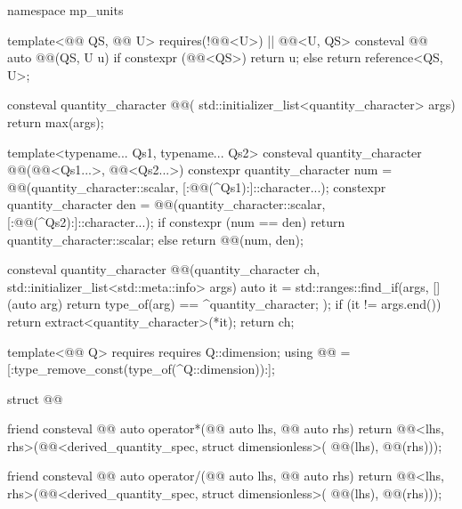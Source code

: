 \begin{codeblock}
namespace mp_units {

template<@@ QS, @@ U>
  requires(!@@<U>) || @@<U, QS{}>
consteval @@ auto @@(QS, U u)
{
  if constexpr (@@<QS>)
    return u;
  else
    return reference<QS, U>{};
}

consteval quantity_character @@(
  std::initializer_list<quantity_character> args)
{
  return max(args);
}

template<typename... Qs1, typename... Qs2>
consteval quantity_character @@(@@<Qs1...>, @@<Qs2...>)
{
  constexpr quantity_character num =
    @@({quantity_character::scalar, [:@@(^Qs1):]::character...});
  constexpr quantity_character den =
    @@({quantity_character::scalar, [:@@(^Qs2):]::character...});
  if constexpr (num == den)
    return quantity_character::scalar;
  else
    return @@({num, den});
}

consteval quantity_character @@(quantity_character ch,
                                                     std::initializer_list<std::meta::info> args)
{
  auto it =
    std::ranges::find_if(args, [](auto arg) { return type_of(arg) == ^quantity_character; });
  if (it != args.end()) return extract<quantity_character>(*it);
  return ch;
}

template<@@ Q>
  requires requires { Q::dimension; }
using @@ = [:type_remove_const(type_of(^Q::dimension)):];

struct @@ {
  friend consteval @@ auto operator*(@@ auto lhs, @@ auto rhs)
  {
    return @@<lhs, rhs>(@@<derived_quantity_spec, struct dimensionless>(
      @@(lhs), @@(rhs)));
  }

  friend consteval @@ auto operator/(@@ auto lhs, @@ auto rhs)
  {
    return @@<lhs, rhs>(@@<derived_quantity_spec, struct dimensionless>(
      @@(lhs), @@(rhs)));
  }

}}
\end{codeblock}
